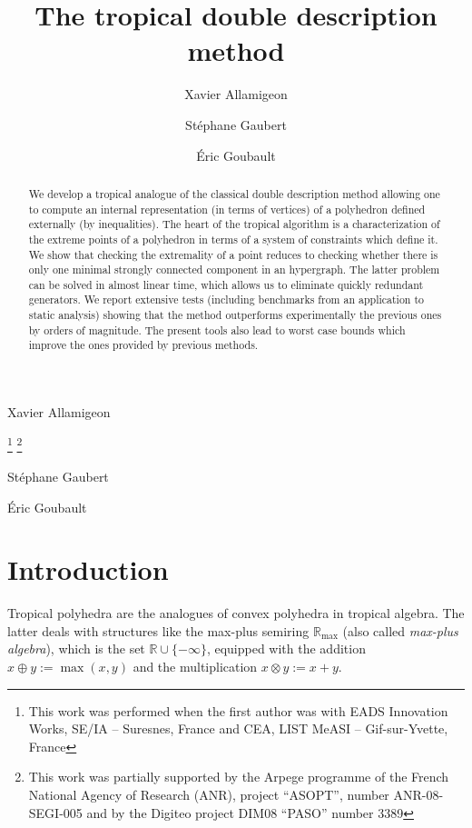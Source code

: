 \documentclass[proceedings]{stacs}
\newcommand{\mpplus}{\oplus}
\newcommand{\mptimes}{\otimes}
\newcommand{\maxplus}{\mathbb{R}_{\max}}
\newcommand{\defin}{:=}\newcommand{\mpzero}{\mathbbb{0}}
\begin{document}
\title{The tropical double description method}
\author[ref1]{Xavier {A}llamigeon}{Xavier {A}llamigeon}
\address[ref1]{Direction du Budget, 4\`eme sous-direction, Bureau des transports, Paris, France}
\thanks{This work was performed when the first author was with EADS Innovation Works, SE/IA -- Suresnes, France and CEA, LIST MeASI -- Gif-sur-Yvette, France}
\thanks{This work was partially supported by the Arpege programme of the French National Agency of Research (ANR), project ``ASOPT'', number ANR-08-SEGI-005 and
by the Digiteo project DIM08 ``PASO'' number 3389}
\author[ref2]{{S}t{\'e}phane {G}aubert}{{S}t{\'e}phane {G}aubert}
\address[ref2]{INRIA Saclay and CMAP, Ecole Polytechnique, France}
\author[ref3]{{\'E}ric {G}oubault}{{\'E}ric {G}oubault}
\address[ref3]{CEA, LIST MeASI -- Gif-sur-Yvette, France}
\begin{abstract}
We develop a tropical analogue of the classical double description
method allowing one to compute an internal
representation (in terms of vertices) of a polyhedron defined
externally (by inequalities).  The heart of the tropical algorithm is
a characterization of the extreme points of a polyhedron in terms of a
system of constraints which define it. We show that checking the
extremality of a point reduces to checking whether there is only one
minimal strongly connected component in an hypergraph. The latter
problem can be solved in almost linear time, which allows us to
eliminate quickly redundant generators. We report extensive tests
(including benchmarks from an application to static analysis) showing
that the method outperforms experimentally the previous ones by orders
of magnitude. The present tools also lead to worst case bounds which
improve the ones provided by previous methods.
\end{abstract}

\maketitle

\section*{Introduction}\label{sec:intro}
Tropical polyhedra are the analogues of convex polyhedra in tropical algebra. The latter deals with structures like the max-plus semiring $\maxplus$ (also called \emph{max-plus algebra}), which is the set $\mathbb{R} \cup \{-\infty\}$, equipped with the addition $x \mpplus y \defin \max(x,y)$ and the multiplication $x \mptimes y \defin x + y$. 
\end{document}
